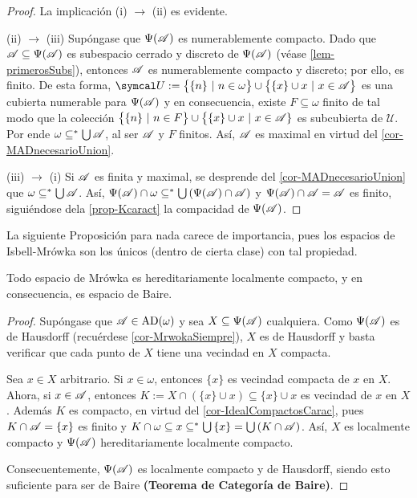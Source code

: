 \begin{proof}
	La implicación (i) $\rightarrow$ (ii) es evidente.

	(ii) $\rightarrow$ (iii) Supóngase que $\Psi(\mathscr{A})$ es numerablemente compacto. Dado que $\mathscr{A} \subseteq \Psi(\mathscr{A})$ es subespacio cerrado y discreto de $\Psi(\mathscr{A})$ (véase \ref{lem-primerosSubs}), entonces $\mathscr{A}$ es numerablemente compacto y discreto; por ello, es finito. De esta forma, $\mathcal{U}:=\big\{ \{n\} \tq n\in \omega \big\} \cup \big\{ \{x\} \cup x \tq x \in \ms{A} \big\}$ es una cubierta numerable para $\Psi(\mathscr{A})$ y en consecuencia, existe $F \subseteq \omega$ finito de tal modo que la colección $\big \{ \{n\} \text{ $|$ } n \in F \big\} \cup \big\{ \{x\} \cup x \text{ $|$ } x \in \mathscr{A}\}$ es subcubierta de $\mathcal{U}$. Por ende $\omega \subseteq^* \mbox{$\bigcup$}\, \mathscr{A}$, al ser $\mathscr{A}$ y $F$ finitos. Así, $\mathscr{A}$ es maximal en virtud del \autoref{cor-MADnecesarioUnion}.

	(iii) $\rightarrow$ (i) Si $\mathscr{A}$ es finita y maximal, se desprende del \autoref{cor-MADnecesarioUnion} que $\omega \subseteq^* \mbox{$\bigcup$}\, \mathscr{A}$. Así, $\Psi(\mathscr{A}) \cap \omega \subseteq^* \mbox{$\bigcup$}\, (\Psi(\mathscr{A}) \cap \mathscr{A} )$ y $\Psi(\mathscr{A}) \cap \mathscr{A} = \mathscr{A}$ es finito, siguiéndose dela \autoref{prop-Kcaract} la compacidad de $\Psi(\mathscr{A})$.
\end{proof}

La siguiente Proposición para nada carece de importancia, pues los espacios de Isbell-Mrówka son los únicos (dentro de cierta clase) con tal propiedad.

\begin{proposicion}\label{prop-MrwokaHLC}
	Todo espacio de Mrówka es hereditariamente localmente compacto, y en consecuencia, es espacio de Baire.
\end{proposicion}

\begin{proof}
	Supóngase que $\mathscr{A}\in \operatorname{AD}(\omega)$ y sea $X \subseteq \Psi(\mathscr{A})$ cualquiera. Como $\Psi(\mathscr{A})$ es de Hausdorff (recuérdese \ref{cor-MrwokaSiempre}), $X$ es de Hausdorff y basta verificar que cada punto de $X$ tiene una vecindad en $X$ compacta.

	Sea $x \in X$ arbitrario. Si $x \in \omega$, entonces $\{x\}$ es vecindad compacta de $x$ en $X$. Ahora, si $x \in \mathscr{A}$, entonces $K:=X \cap (\{x\} \cup x) \subseteq \{x\} \cup x$ es vecindad de $x$ en $X$. Además $K$ es compacto, en virtud del \autoref{cor-IdealCompactosCarac}, pues $K \cap \mathscr{A} = \{x\}$ es finito y $K \cap \omega \subseteq x \subseteq^* \mbox{$\bigcup$}\, \{x\} = \mbox{$\bigcup$}\, (K \cap \mathscr{A})$. Así, $X$ es localmente compacto y $\Psi(\mathscr{A})$ hereditariamente localmente compacto.

	Consecuentemente, $\Psi(\mathscr{A})$ es localmente compacto y de Hausdorff, siendo esto suficiente para ser de Baire \textbf{(Teorema de Categoría de Baire)}.
\end{proof}

